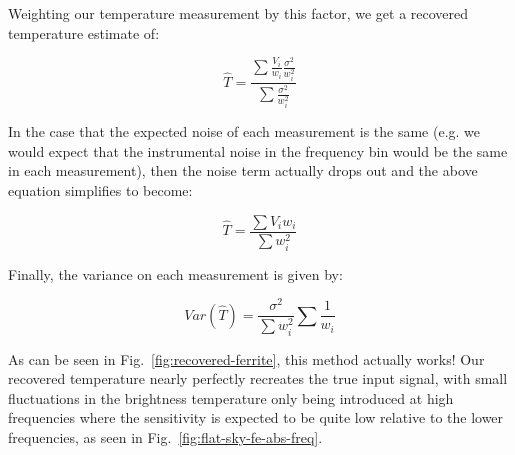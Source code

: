 Weighting our temperature measurement by this factor, we get a recovered 
temperature estimate of:

\begin{equation}
     \hat{T} = \frac{\sum \frac{V_i}{w_i} \frac{\sigma^2}{w_i^2}}{\sum 
     \frac{\sigma^2}{w_i^2}}
     \label{eq:measured-T}
\end{equation}

In the case that the expected noise of each measurement is the same (e.g. we 
would expect that the instrumental noise in the frequency bin would be the same 
in each measurement), then the noise term actually drops out and the above 
equation simplifies to become:

\begin{equation}
     \hat{T} = \frac{\sum V_i w_i}{\sum w_i^2}
     \label{eq:measured-T-simplified}
\end{equation}

Finally, the variance on each measurement is given by:

\begin{equation}
    Var(\hat{T}) = \frac{\sigma^2}{\sum w_i^2} \sum \frac{1}{w_i}
    \label{eq:measured-T-variance}
\end{equation}

As can be seen in Fig.~\ref{fig:recovered-ferrite}, this method actually works!  
Our recovered temperature nearly perfectly recreates the true input signal, 
with small fluctuations in the brightness temperature only being introduced at 
high frequencies where the sensitivity is expected to be quite low relative to 
the lower frequencies, as seen in Fig.~\ref{fig:flat-sky-fe-abs-freq}.

